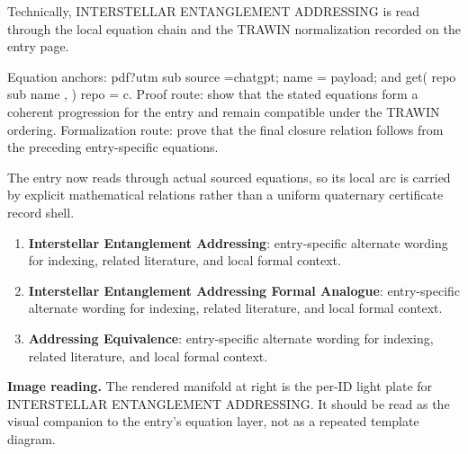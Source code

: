 Technically, INTERSTELLAR ENTANGLEMENT ADDRESSING is read through the local equation chain and the TRAWIN normalization recorded on the entry page.

Equation anchors: pdf?utm sub source =chatgpt; name = payload; and get( repo sub name , ) repo = c. Proof route: show that the stated equations form a coherent progression for the entry and remain compatible under the TRAWIN ordering. Formalization route: prove that the final closure relation follows from the preceding entry-specific equations.

The entry now reads through actual sourced equations, so its local arc is carried by explicit mathematical relations rather than a uniform quaternary certificate record shell.
\endgroup

\begin{enumerate}[leftmargin=1.6em,itemsep=6pt,topsep=4pt]
\item \textbf{Interstellar Entanglement Addressing}: entry-specific alternate wording for indexing, related literature, and local formal context.
\item \textbf{Interstellar Entanglement Addressing Formal Analogue}: entry-specific alternate wording for indexing, related literature, and local formal context.
\item \textbf{Addressing Equivalence}: entry-specific alternate wording for indexing, related literature, and local formal context.
\end{enumerate}

\begin{samepage}
\noindent\begin{minipage}[t]{0.45\linewidth}
\vspace{0pt}
\raggedright
\scriptsize\textbf{Image reading.} The rendered manifold at right is the per-ID light plate for INTERSTELLAR ENTANGLEMENT ADDRESSING. It should be read as the visual companion to the entry's equation layer, not as a repeated template diagram.\par
\end{minipage}\hfill
\begin{minipage}[t]{0.53\linewidth}
\vspace*{-0.10in}
\raggedright
{}
\end{minipage}
\end{samepage}

